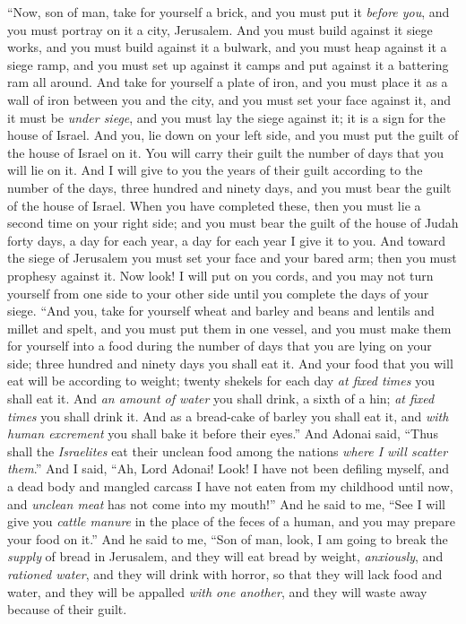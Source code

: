 \begin{biblechapter} %
 “Now, son of man, take for yourself a brick, and you must put it \textit{before you}, and you must portray on it a city, Jerusalem.
\verse And you must build against it siege works, and you must build against it a bulwark, and you must heap against it a siege ramp, and you must set up against it camps and put against it a battering ram all around.
\verse And take for yourself a plate of iron, and you must place it as a wall of iron between you and the city, and you must set your face against it, and it must be \textit{under siege}, and you must lay the siege against it; it is a sign for the house of Israel.
\verse And you, lie down on your left side, and you must put the guilt of the house of Israel on it. You will carry their guilt the number of days that you will lie on it.
\verse And I will give to you the years of their guilt according to the number of the days, three hundred and ninety days, and you must bear the guilt of the house of Israel.
\verse When you have completed these, then you must lie a second time on your right side; and you must bear the guilt of the house of Judah forty days, a day for each year, a day for each year I give it to you.
\verse And toward the siege of Jerusalem you must set your face and your bared arm; then you must prophesy against it.
\verse Now look! I will put on you cords, and you may not turn yourself from one side to your other side until you complete the days of your siege.
 “And you, take for yourself wheat and barley and beans and lentils and millet and spelt, and you must put them in one vessel, and you must make them for yourself into a food during the number of days that you are lying on your side; three hundred and ninety days you shall eat it.
\verse And your food that you will eat will be according to weight; twenty shekels for each day \textit{at fixed times} you shall eat it.
\verse And \textit{an amount of water} you shall drink, a sixth of a hin; \textit{at fixed times} you shall drink it.
\verse And as a bread-cake of barley you shall eat it, and \textit{with human excrement} you shall bake it before their eyes.”
\verse And Adonai said, “Thus shall the \textit{Israelites} eat their unclean food among the nations \textit{where I will scatter them}.”
\verse And I said, “Ah, Lord Adonai! Look! I have not been defiling myself, and a dead body and mangled carcass I have not eaten from my childhood until now, and \textit{unclean meat} has not come into my mouth!”
\verse And he said to me, “See I will give you \textit{cattle manure} in the place of the feces of a human, and you may prepare your food on it.”
\verse And he said to me, “Son of man, look, I am going to break the \textit{supply} of bread in Jerusalem, and they will eat bread by weight, \textit{anxiously}, and \textit{rationed water}, and they will drink with horror,
\verse so that they will lack food and water, and they will be appalled \textit{with one another}, and they will waste away because of their guilt.
\end{biblechapter}

